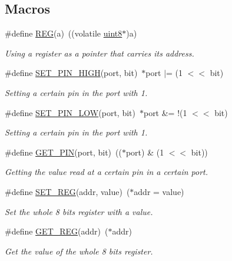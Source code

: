 \subsection*{Macros}
\begin{DoxyCompactItemize}
\item 
\#define \hyperlink{group__MCAL_ga72e45020e46f285689db51c46f273403}{R\+E\+G}(a)~((volatile \hyperlink{types_8h_a3c77e3a247345b581bdb6939ffe95a94}{uint8}$\ast$)a)
\begin{DoxyCompactList}\small\item\em Using a register as a pointer that carries its address. \end{DoxyCompactList}\item 
\#define \hyperlink{group__MCAL_ga4ef436a33661955331d4f06c5b072b8a}{S\+E\+T\+\_\+\+P\+I\+N\+\_\+\+H\+I\+G\+H}(port, bit)~$\ast$port $\vert$= (1 $<$$<$ bit)
\begin{DoxyCompactList}\small\item\em Setting a certain pin in the port with 1. \end{DoxyCompactList}\item 
\#define \hyperlink{group__MCAL_ga70e051310296f88da01c08c6fe5434cd}{S\+E\+T\+\_\+\+P\+I\+N\+\_\+\+L\+O\+W}(port, bit)~$\ast$port \&= !(1 $<$$<$ bit)
\begin{DoxyCompactList}\small\item\em Setting a certain pin in the port with 1. \end{DoxyCompactList}\item 
\#define \hyperlink{group__MCAL_ga014f8508450471f6b8e367cdb8963eb7}{G\+E\+T\+\_\+\+P\+I\+N}(port, bit)~(($\ast$port) \& (1 $<$$<$ bit))
\begin{DoxyCompactList}\small\item\em Getting the value read at a certain pin in a certain port. \end{DoxyCompactList}\item 
\#define \hyperlink{group__MCAL_ga5a45bfe19b2e9ee571104bc500f2e081}{S\+E\+T\+\_\+\+R\+E\+G}(addr, value)~($\ast$addr = value)
\begin{DoxyCompactList}\small\item\em Set the whole 8 bits register with a value. \end{DoxyCompactList}\item 
\#define \hyperlink{group__MCAL_ga03e68fe9bebe935ca7e2dd2c9860aa5b}{G\+E\+T\+\_\+\+R\+E\+G}(addr)~($\ast$addr)
\begin{DoxyCompactList}\small\item\em Get the value of the whole 8 bits register. \end{DoxyCompactList}\end{DoxyCompactItemize}
